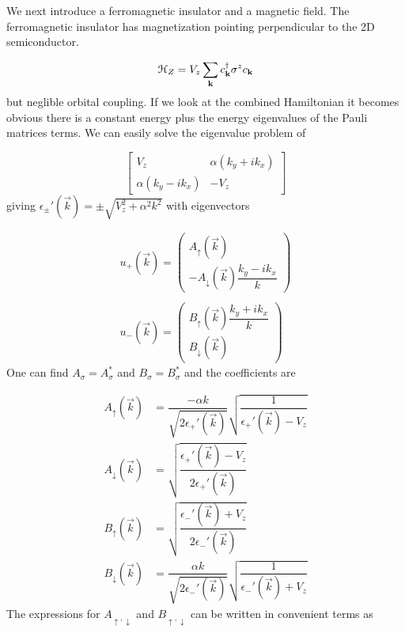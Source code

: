 We next introduce a ferromagnetic insulator and a magnetic field. The ferromagnetic insulator has magnetization pointing perpendicular to the 2D semiconductor.

\begin{equation}
  \mathcal{H}_Z = V_z \sum_{\mathbf{k}} c^{\dagger}_{\mathbf{k}} \sigma^z c_{\mathbf{k}}
\end{equation}
but neglible orbital coupling. If we look at the combined Hamiltonian it becomes obvious there is a constant energy plus the energy eigenvalues of the Pauli matrices terms. We can easily solve the eigenvalue problem of

\begin{equation}
  \begin{bmatrix}
    V_z & \alpha (k_y + i k_x) \\
    \alpha (k_y -i k_x) & -V_z
  \end{bmatrix}
\end{equation}
giving $\epsilon_{\pm}'(\vec{k}) = \pm \sqrt{V_z^2+\alpha^2 k^2}$ with eigenvectors

\begin{align}
  u_+(\vec{k})  =
  \left( \begin{array}{l}
      A_\uparrow(\vec{k}) \\
      -A_\downarrow(\vec{k}) \dfrac{k_y - i k_x}{k}
  \end{array} \right)
  \\ \\
  u_-(\vec{k})  =
  \left( \begin{array}{l}
      B_\uparrow(\vec{k}) \dfrac{k_y + i k_x}{k}  \\
      B_\downarrow(\vec{k})
  \end{array} \right)
\end{align}
One can find $A_{\sigma}=A_{\sigma}^*$ and $B_{\sigma}=B_{\sigma}^*$ and the coefficients are

\begin{align}
  A_{\uparrow}(\vec{k}) &= \dfrac{-\alpha k}{\sqrt{2\epsilon_+'(\vec{k})}} \sqrt{\dfrac{1}{\epsilon_+'(\vec{k})-V_z}} \\
A_{\downarrow}(\vec{k}) &= \sqrt{\dfrac{\epsilon_+'(\vec{k})-V_z}{2\epsilon_+'(\vec{k})}} \\
B_{\uparrow}(\vec{k}) &= \sqrt{\dfrac{\epsilon_-'(\vec{k})+V_z}{2\epsilon_-'(\vec{k})}} \\
B_{\downarrow}(\vec{k}) &= \dfrac{\alpha k}{\sqrt{2\epsilon_-'(\vec{k})}} \sqrt{\dfrac{1}{\epsilon_-'(\vec{k})+V_z}}
\end{align}
The expressions for $A_{\uparrow,\downarrow}$ and $B_{\uparrow,\downarrow}$ can be written in convenient terms as

